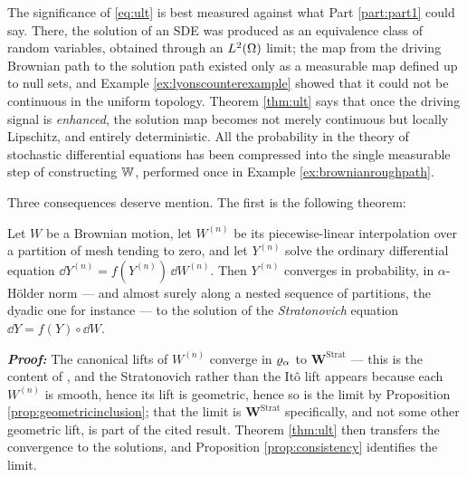 \medskip

The significance of \eqref{eq:ult} is best measured against what Part \ref{part:part1} could say.
There, the solution of an SDE was produced as an equivalence class of random variables, obtained
through an $L^2(\Omega)$ limit; the map from the driving Brownian path to the solution path existed
only as a measurable map defined up to null sets, and Example \ref{ex:lyonscounterexample} showed
that it could not be continuous in the uniform topology. Theorem \ref{thm:ult} says that once the
driving signal is \emph{enhanced}, the solution map becomes not merely continuous but locally Lipschitz, and entirely
deterministic. All the probability in the theory of stochastic differential equations has been
compressed into the single measurable step of constructing $\mathbb{W}$, performed once in Example
\ref{ex:brownianroughpath}.

Three consequences deserve mention. The first is the following theorem:

\begin{corollary}\label{cor:wongzakai}
Let $W$ be a Brownian motion, let $W^{(n)}$ be its piecewise-linear interpolation over a partition of mesh
tending to zero, and let $Y^{(n)}$ solve the ordinary differential equation
$\dd Y^{(n)} = f(Y^{(n)})\,\dd W^{(n)}$. Then $Y^{(n)}$ converges in probability, in
$\alpha$-Hölder norm --- and almost surely along a nested sequence of partitions, the dyadic one for
instance --- to the solution of the \emph{Stratonovich} equation
$\dd Y = f(Y)\circ \dd W$.
\end{corollary}

\textbf{\textit{Proof:}} The canonical lifts of $W^{(n)}$ converge in $\varrho_{\alpha}$ to
$\mathbf{W}^{\mathrm{Strat}}$ --- this is the content of \cite[Ch.\ 3]{frizhairer2020}, and the
Stratonovich rather than the Itô lift appears because each $W^{(n)}$ is smooth, hence its lift is
geometric, hence so is the limit by Proposition \ref{prop:geometricinclusion}; that the limit is
$\mathbf{W}^{\mathrm{Strat}}$ specifically, and not some other geometric lift, is part of the cited
result. Theorem
\ref{thm:ult} then transfers the convergence to the solutions, and Proposition
\ref{prop:consistency} identifies the limit. \qedfilledtext

\medskip


